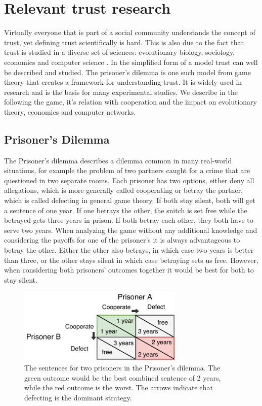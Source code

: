 \section{Relevant trust research}
Virtually everyone that is part of a social community understands the concept of trust, yet defining
trust scientifically is hard. This is also due to the fact that trust is studied in a diverse set 
of sciences: evolutionary biology, sociology, economics and computer science \cite{shockley2015interdisciplinary}. In the simplified
form of a model trust can well be described and studied. The prisoner's 
dilemma \cite{rapoport1965prisoner} is one such model from game theory that creates a framework for 
understanding trust. It is widely used in research and is the basis for many experimental studies.
We describe in the following the game, it's relation with cooperation and the impact on evolutionary
theory, economics and computer networks.

\subsection{Prisoner's Dilemma}
\label{sec:prisoner}
The Prisoner's dilemma describes a dilemma common in many real-world situations, for
example the problem of two partners caught for a crime that are questioned in two separate rooms. 
Each prisoner has two options, either deny all allegations, which is more generally called cooperating
 or betray the partner, which is called defecting in general game theory. If both stay 
silent, both will get a sentence of one year. If one betrays the other, the snitch is set free while the 
betrayed gets three years in prison. If both betray each other, they both have to serve two years.
When analyzing the game without any additional knowledge and considering the payoffs for one of the
prisoner's it is always advantageous to betray the other. Either the other also betrays, in which case
two years is better than three, or the other stays silent in which case betraying sets us free. 
However, when considering both prisoners' outcomes together it would be best for both to stay silent.
\cite{rapoport1965prisoner}

\begin{figure}
    \centering
    \includegraphics[width=0.7\textwidth]{images/prisoners_dilemma.pdf}
    \caption{The sentences for two prisoners in the Prisoner's dilemma. The green outcome would be 
    the best combined sentence of 2 years, while the red outcome is the worst. The arrows indicate that defecting is the dominant strategy.}
\end{figure}

